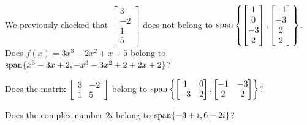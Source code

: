 \begin{applicationActivities}
\begin{activity}{5}
  We previously checked that \(\begin{bmatrix}3\\-2\\1 \\ 5\end{bmatrix}\)
  does not belong to
  \(\operatorname{span}\left\{\begin{bmatrix}1\\0\\-3 \\ 2\end{bmatrix},
  \begin{bmatrix}-1\\-3\\2 \\ 2\end{bmatrix}\right\}\).
  Does \(f(x)=3x^3-2x^2+x+5\) belong to
  \(\operatorname{span}\{x^3-3x+2,-x^3-3x^2+2+2x+2\}\)?
\end{activity}

\begin{activity}{10}
  Does the matrix \(\begin{bmatrix}3&-2\\1&5\end{bmatrix}\) belong to
  \(\operatorname{span}\left\{\begin{bmatrix}1&0\\-3&2\end{bmatrix},
  \begin{bmatrix}-1&-3\\2&2\end{bmatrix}\right\}\)?
\end{activity}

\begin{activity}{5}
  Does the complex number \(2i\) belong to
  \(\operatorname{span}\{-3+i,6-2i\}\)?
\end{activity}

\end{applicationActivities}
